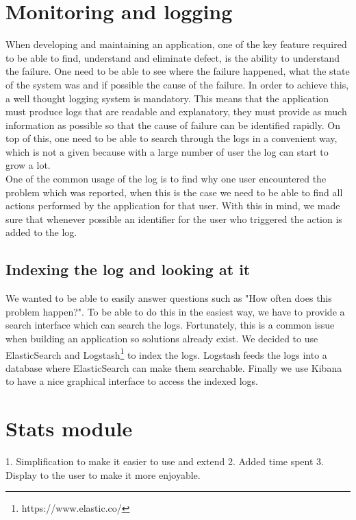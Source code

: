 \section{Monitoring and logging}\label{sec:logging}
When developing and maintaining an application, one of the key feature required to be able to find, understand and eliminate defect, is the ability to understand the failure. One need to be able to see where the failure happened, what the state of the system was and if possible the cause of the failure. In order to achieve this, a well thought logging system is mandatory. This means that the application must produce logs that are readable and explanatory, they must provide as much information as possible so that the cause of failure can be identified rapidly. On top of this, one need to be able to search through the logs in a convenient way, which is not a given because with a large number of user the log can start to grow a lot.\\
One of the common usage of the log is to find why one user encountered the problem which was reported, when this is the case we need to be able to find all actions performed by the application for that user. With this in mind, we made sure that whenever possible an identifier for the user who triggered the action is added to the log.
\subsection{Indexing the log and looking at it}
We wanted to be able to easily answer questions such as "How often does this problem happen?". To be able to do this in the easiest way, we have to provide a search interface which can search the logs. Fortunately, this is a common issue when building an application so solutions already exist. We decided to use ElasticSearch and Logstash\footnote{https://www.elastic.co/} to index the logs. Logstash feeds the logs into a database where ElasticSearch can make them searchable. Finally we use Kibana to have a nice graphical interface to access the indexed logs. %
\section{Stats module}

1. Simplification to make it easier to use and extend
2. Added time spent
3. Display to the user to make it more enjoyable.